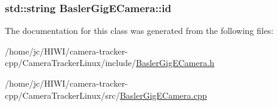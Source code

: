 \subsubsection[{\texorpdfstring{id}{id}}]{\setlength{\rightskip}{0pt plus 5cm}std\+::string Basler\+Gig\+E\+Camera\+::id\hspace{0.3cm}{\ttfamily [private]}}\hypertarget{class_basler_gig_e_camera_a1f2a44906ddb75d4fa3b0d37bc6a131e}{}\label{class_basler_gig_e_camera_a1f2a44906ddb75d4fa3b0d37bc6a131e}


The documentation for this class was generated from the following files\+:\begin{DoxyCompactItemize}
\item 
/home/jc/\+H\+I\+W\+I/camera-\/tracker-\/cpp/\+Camera\+Tracker\+Linux/include/\hyperlink{_basler_gig_e_camera_8h}{Basler\+Gig\+E\+Camera.\+h}\item 
/home/jc/\+H\+I\+W\+I/camera-\/tracker-\/cpp/\+Camera\+Tracker\+Linux/src/\hyperlink{_basler_gig_e_camera_8cpp}{Basler\+Gig\+E\+Camera.\+cpp}\end{DoxyCompactItemize}
